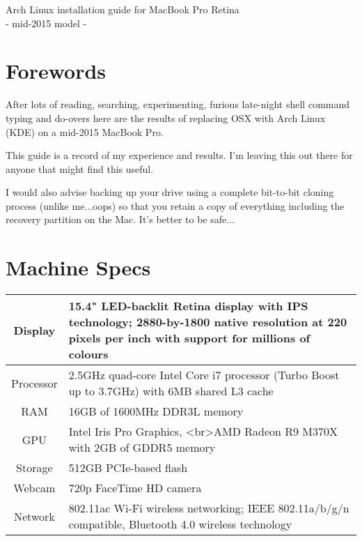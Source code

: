 
\color{dark}
\setlength{\parindent}{0em}
\setlength{\parskip}{0.5em}
\renewcommand{\baselinestretch}{1.2}


\centering
\LARGE
Arch Linux installation guide for MacBook Pro Retina\\
 - mid-2015 model - 
\normalsize\justify
\tableofcontents
\clearpage

\section{Forewords}

\noindent After lots of reading, searching, experimenting, furious late-night shell command typing and 
do-overs here are the results of replacing OSX with Arch Linux (KDE) on a mid-2015 MacBook Pro. 

\noindent This guide is a record of my experience and results. I'm leaving this out there for anyone that
might find this useful.

\noindent I would also advise backing up your drive using a complete bit-to-bit cloning process (unlike me...oops) so that you retain a copy of everything including the recovery partition on the Mac. 
It's better to be safe...

\section{Machine Specs}

\begin{tabularx}{\textwidth}{|c|X|}
	\hline
	Display   & 15.4" LED-backlit Retina display with IPS technology; 2880-by-1800 native resolution at 220 pixels per inch with support for millions of colours \\\hline
	Processor & 2.5GHz quad-core Intel Core i7 processor (Turbo Boost up to 3.7GHz) with 6MB shared L3 cache \\\hline
	RAM       & 16GB of 1600MHz DDR3L memory \\\hline
	GPU       & Intel Iris Pro Graphics, <br>AMD Radeon R9 M370X with 2GB of GDDR5 memory \\\hline
	Storage   & 512GB PCIe-based flash \\\hline
	Webcam    & 720p FaceTime HD camera \\\hline
	Network   & 802.11ac Wi‑Fi wireless networking; IEEE 802.11a/b/g/n compatible, \linebreak
				Bluetooth 4.0 wireless technology \\\hline
\end{tabularx}

